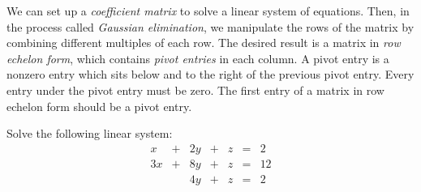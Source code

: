 \documentclass[../main.tex]{subfiles}
\begin{document}
We can set up a \textit{coefficient matrix} to solve a linear system of equations.
Then, in the process called \textit{Gaussian elimination}, we manipulate the
rows of the matrix by combining different multiples of each row. The
desired result is a matrix in \textit{row echelon form}, which contains
\textit{pivot entries} in each column. A pivot entry is a nonzero entry
which sits below and to the right of the previous pivot entry.
Every entry under the pivot entry must be zero. The first entry
of a matrix in row echelon form should be a pivot entry.

\begin{example}
	Solve the following linear system:
	\[\begin{array}{rrrrrrr}
			x  & + & 2y & + & z & = & 2  \\
			3x & + & 8y & + & z & = & 12 \\
			   &   & 4y & + & z & = & 2
		\end{array}\]
\end{example}
\end{document}
